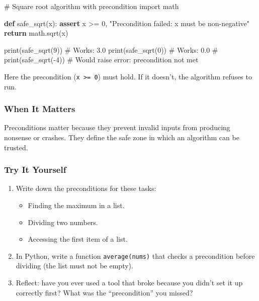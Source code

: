 \documentclass[
  letterpaper,
  DIV=11,
  numbers=noendperiod]{scrreprt}
\newenvironment{Shaded}{\begin{snugshade}}{\end{snugshade}}
\newcommand{\BuiltInTok}[1]{\textcolor[rgb]{0.00,0.23,0.31}{#1}}
\newcommand{\CommentTok}[1]{\textcolor[rgb]{0.37,0.37,0.37}{#1}}
\newcommand{\ControlFlowTok}[1]{\textcolor[rgb]{0.00,0.23,0.31}{\textbf{#1}}}
\newcommand{\DecValTok}[1]{\textcolor[rgb]{0.68,0.00,0.00}{#1}}
\newcommand{\ImportTok}[1]{\textcolor[rgb]{0.00,0.46,0.62}{#1}}
\newcommand{\KeywordTok}[1]{\textcolor[rgb]{0.00,0.23,0.31}{\textbf{#1}}}
\newcommand{\NormalTok}[1]{\textcolor[rgb]{0.00,0.23,0.31}{#1}}
\newcommand{\OperatorTok}[1]{\textcolor[rgb]{0.37,0.37,0.37}{#1}}
\newcommand{\StringTok}[1]{\textcolor[rgb]{0.13,0.47,0.30}{#1}}
\providecommand{\tightlist}{%
  \setlength{\itemsep}{0pt}\setlength{\parskip}{0pt}}
\begin{document}
\begin{Shaded}
\begin{Highlighting}[]
\CommentTok{\# Square root algorithm with precondition}
\ImportTok{import}\NormalTok{ math}

\KeywordTok{def}\NormalTok{ safe\_sqrt(x):}
    \ControlFlowTok{assert}\NormalTok{ x }\OperatorTok{\textgreater{}=} \DecValTok{0}\NormalTok{, }\StringTok{"Precondition failed: x must be non{-}negative"}
    \ControlFlowTok{return}\NormalTok{ math.sqrt(x)}

\BuiltInTok{print}\NormalTok{(safe\_sqrt(}\DecValTok{9}\NormalTok{))   }\CommentTok{\# Works: 3.0}
\BuiltInTok{print}\NormalTok{(safe\_sqrt(}\DecValTok{0}\NormalTok{))   }\CommentTok{\# Works: 0.0}
\CommentTok{\# print(safe\_sqrt({-}4)) \# Would raise error: precondition not met}
\end{Highlighting}
\end{Shaded}

Here the precondition (\texttt{x\ \textgreater{}=\ 0}) must hold. If it
doesn't, the algorithm refuses to run.

\subsubsection{When It Matters}\label{when-it-matters-59}

Preconditions matter because they prevent invalid inputs from producing
nonsense or crashes. They define the safe zone in which an algorithm can
be trusted.

\subsubsection{Try It Yourself}\label{try-it-yourself-61}

\begin{enumerate}
\def\labelenumi{\arabic{enumi}.}
\item
  Write down the preconditions for these tasks:

  \begin{itemize}
  \tightlist
  \item
    Finding the maximum in a list.
  \item
    Dividing two numbers.
  \item
    Accessing the first item of a list.
  \end{itemize}
\item
  In Python, write a function \texttt{average(nums)} that checks a
  precondition before dividing (the list must not be empty).
\item
  Reflect: have you ever used a tool that broke because you didn't set
  it up correctly first? What was the ``precondition'' you missed?
\end{enumerate}
\end{document}
